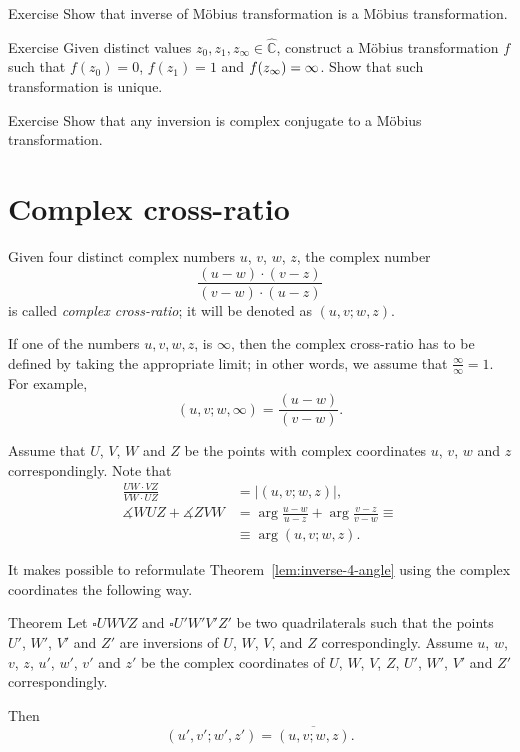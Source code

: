 \begin{thm}{Exercise}\label{ex:inverse-Mob}
Show that inverse of M\"obius transformation is a M\"obius transformation.
\end{thm}


\begin{thm}{Exercise}\label{ex:3-point-Mob}
Given distinct values $z_0,z_1,z_\infty\in \hat{\mathbb{C}}$,
construct a M\"obius transformation $f$ such that $f(z_0)=0$, $f(z_1)=1$ and $f(z_\infty)\z=\infty$.
Show that such transformation is unique.
\end{thm}

\begin{thm}{Exercise}\label{ex:invesion-Mob}
Show that any inversion is complex conjugate to a M\"obius transformation.  
\end{thm}



\section*{Complex cross-ratio}

Given four distinct complex numbers $u$, $v$, $w$, $z$,
the complex number
$$
\frac{(u-w)\cdot(v-z)}{(v-w)\cdot(u-z)}$$
is called \emph{complex cross-ratio}; it will be denoted as $(u,v;w,z)$.

If one of the numbers $u, v, w, z$, is $\infty$, 
then the complex cross-ratio has to be defined by taking the appropriate limit; in other words, we assume that $\frac\infty\infty=1$.
For example,
$$(u, v; w, \infty)=\frac{(u-w)}{(v-w)}.$$

Assume that $U$, $V$, $W$ and  $Z$ be the points with complex coordinates  
$u$, $v$, $w$ and $z$ correspondingly.
Note that 
\begin{align*}
\frac{UW\cdot VZ}{VW\cdot UZ}&=|(u,v;w,z)|,
\\
\measuredangle WUZ +\measuredangle ZVW&=\arg\frac{u-w}{u-z}+\arg\frac{v-z}{v-w}\equiv 
\\
&\equiv \arg(u,v;w,z).
\end{align*}

It makes possible to reformulate Theorem~\ref{lem:inverse-4-angle} using the complex coordinates
the following way.

\begin{thm}{Theorem}\label{lem:inverse-4-angle-C}
Let $\square UWVZ$ and $\square U'W'V'Z'$  be two quadrilaterals 
such that the points $U'$, $W'$, $V'$ and $Z'$ are inversions of $U$, $W$, $V$, and $Z$ correspondingly.
Assume $u$, $w$, $v$, $z$, $u'$, $w'$, $v'$ and $z'$ be the complex coordinates of $U$, $W$, $V$, $Z$, $U'$, $W'$, $V'$ and $Z'$ correspondingly.

Then 
$$(u',v';w',z')=\overline{(u,v;w,z)}.$$

\end{thm}

